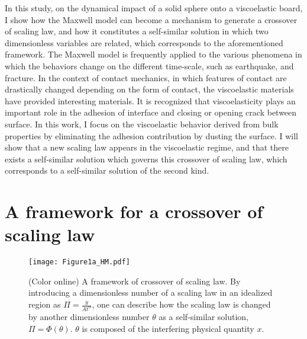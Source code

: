 \documentclass[default,iicol,10pt]{sn-jnl}%
\theoremstyle{thmstyleone}%
\theoremstyle{thmstyletwo}%
\theoremstyle{thmstylethree}%
\begin{document}
In this study, on the dynamical impact of a solid sphere onto a viscoelastic board, I show how the Maxwell model can become a mechanism to generate a crossover of scaling law, and how it constitutes a self-similar solution in which two dimensionless variables are related, which corresponds to the aforementioned framework. The Maxwell model is frequently applied to the various phenomena in which the behaviors change on the different time-scale, such as earthquake\cite{Suito,Agata}, and fracture\cite{Persson,SakuOku}. In the context of contact mechanics\cite{Hertz,Johnson, Goryacheva}, in which features of contact are drastically changed\cite{Carpick,Kogut} depending on the form of contact, the viscoelastic materials have provided interesting materials\cite{Hunter,Hertzsch,Brilliantov}. It is recognized that viscoelasticity plays an important role in the adhesion of interface and closing or opening crack between surface\cite{Persson}. In this work, I focus on the viscoelastic behavior derived from bulk properties by eliminating the adhesion contribution by dusting the surface. I will show that a new scaling law appears in the viscoelastic regime, and that there exists a self-similar solution which governs this crossover of scaling law, which corresponds to a self-similar solution of the second kind. 

\section{A framework for a crossover of scaling law}\label{sec1}

%
\begin{figure}[h] 
\begin{center} 
\texttt{[image: Figure1a\_HM.pdf]}
\caption{(Color online) A framework of crossover of scaling law. By introducing a dimensionless number of a scaling law in an idealized region as $\Pi =\frac{y}{At^{\alpha}}$, one can describe how the scaling law is changed by another dimensionless number $\theta$ as a self-similar solution, $\Pi = \Phi \left( \theta\right)$. $\theta$ is composed of the interfering physical quantity $x$.  }
\label{fig:F1a}
\end{center}
\end{figure} 
%
\end{document}
